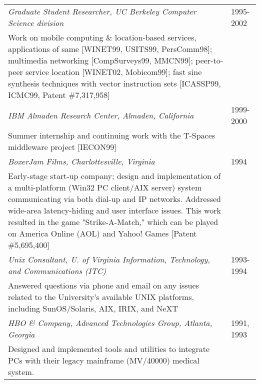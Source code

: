 \begin{tabular}{p{5.3in}@{\hspace{1.5cm}}l}
    \em Graduate Student Researcher, UC Berkeley Computer Science division
                                                                 & 1995-2002 \\
       Work on mobile computing \& location-based services, applications of same 
       [WINET99, USITS99, PersComm98]; 
       multimedia networking [CompSurveys99, MMCN99];
       peer-to-peer service location [WINET02, Mobicom99];
       fast sine synthesis techniques with vector instruction 
       sets [ICASSP99, ICMC99, Patent \#7,317,958] \\[9pt]

    \em IBM Almaden Research Center, 
          Almaden, California
                                                              & 1999-2000 \\
       Summer internship and continuing work with
       the T-Spaces middleware project [IECON99] \\[9pt]

    \em BoxerJam Films, Charlottesville, Virginia                & 1994 \\
       Early-stage start-up company; design and implementation of 
       a multi-platform (Win32 PC client/AIX server)
       system communicating via both dial-up and IP
       networks.  Addressed wide-area latency-hiding and user interface
       issues.  This work resulted in the game "Strike-A-Match,"
       which can be played on America Online (AOL) and Yahoo! Games
       [Patent \#5,695,400] \\[9pt]

    \em Unix Consultant, U. of Virginia Information, 
         Technology, and Communications  (ITC)              & 1993-1994 \\
       Answered questions via phone and email on any issues related to the
       University's available UNIX platforms, including SunOS/Solaris,
       AIX, IRIX, and NeXT \\[9pt]

    \em HBO \& Company, Advanced Technologies Group, 
           Atlanta, Georgia                                      & 1991, 1993 \\
       Designed and implemented tools and utilities to
       integrate PCs with their
       legacy mainframe (MV/40000) medical system. \\

 \end{tabular}






